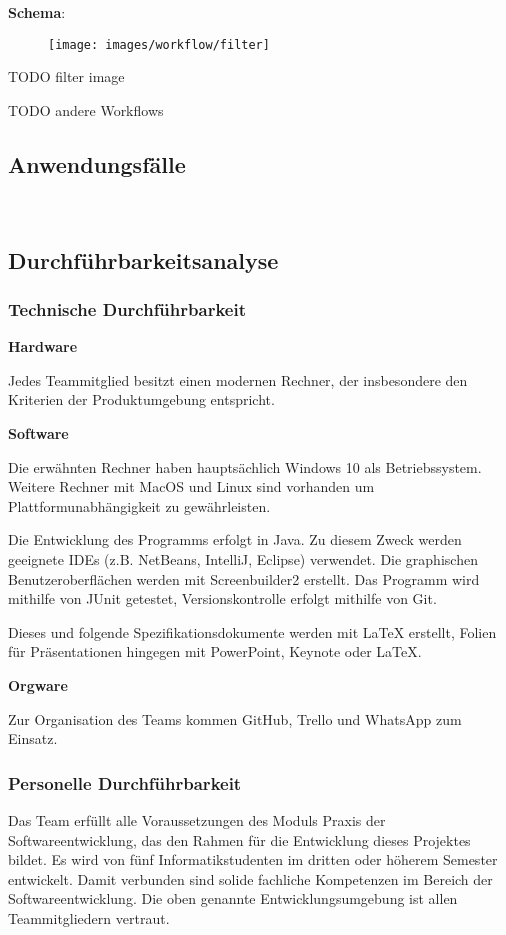 \documentclass{article}
\begin{document}
	\textbf{Schema}:
	~\begin{figure}[!h]
		\centering
		\texttt{[image: images/workflow/filter]}
	\end{figure}
	TODO filter image
	
	TODO andere Workflows
	
	
	\subsection{Anwendungsfälle}
	
	~\newpage
	\subsection{Durchführbarkeitsanalyse}
	\subsubsection{Technische Durchführbarkeit}
	\textbf{Hardware}
	
	Jedes Teammitglied besitzt einen modernen Rechner, der insbesondere den Kriterien der Produktumgebung entspricht.
	\newline
	
	\textbf{Software}
	
	Die erwähnten Rechner haben hauptsächlich Windows 10 als Betriebssystem. Weitere Rechner mit MacOS und Linux sind vorhanden um Plattformunabhängigkeit zu gewährleisten.
	
	Die Entwicklung des Programms erfolgt in Java. Zu diesem Zweck werden geeignete IDEs (z.B. NetBeans, IntelliJ, Eclipse) verwendet. Die graphischen Benutzeroberflächen werden mit Screenbuilder2 erstellt. Das Programm wird mithilfe von JUnit getestet, Versionskontrolle erfolgt mithilfe von Git.
	
	Dieses und folgende Spezifikationsdokumente werden mit LaTeX erstellt, Folien für Präsentationen hingegen mit PowerPoint, Keynote oder LaTeX.
	\newline
	
	\textbf{Orgware}
	
	Zur Organisation des Teams kommen GitHub, Trello und WhatsApp zum Einsatz.
	
	\subsubsection{Personelle Durchführbarkeit}
	Das Team erfüllt alle Voraussetzungen des Moduls Praxis der Softwareentwicklung, das den Rahmen für die Entwicklung dieses Projektes bildet. Es wird von fünf Informatikstudenten im dritten oder höherem Semester entwickelt. Damit verbunden sind solide fachliche Kompetenzen im Bereich der Softwareentwicklung. Die oben genannte Entwicklungsumgebung ist allen Teammitgliedern vertraut.
	
\end{document}
